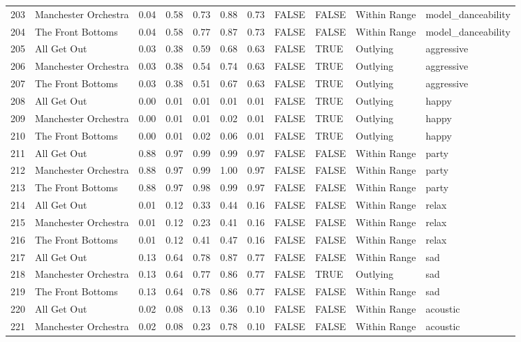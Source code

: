 \begin{table}[ht]
\begin{tabular}{rlrrrrrllll}
  203 & Manchester Orchestra & 0.04 & 0.58 & 0.73 & 0.88 & 0.73 & FALSE & FALSE & Within Range & model\_danceability \\ 
  204 & The Front Bottoms & 0.04 & 0.58 & 0.77 & 0.87 & 0.73 & FALSE & FALSE & Within Range & model\_danceability \\ 
  205 & All Get Out & 0.03 & 0.38 & 0.59 & 0.68 & 0.63 & FALSE & TRUE & Outlying & aggressive \\ 
  206 & Manchester Orchestra & 0.03 & 0.38 & 0.54 & 0.74 & 0.63 & FALSE & TRUE & Outlying & aggressive \\ 
  207 & The Front Bottoms & 0.03 & 0.38 & 0.51 & 0.67 & 0.63 & FALSE & TRUE & Outlying & aggressive \\ 
  208 & All Get Out & 0.00 & 0.01 & 0.01 & 0.01 & 0.01 & FALSE & TRUE & Outlying & happy \\ 
  209 & Manchester Orchestra & 0.00 & 0.01 & 0.01 & 0.02 & 0.01 & FALSE & TRUE & Outlying & happy \\ 
  210 & The Front Bottoms & 0.00 & 0.01 & 0.02 & 0.06 & 0.01 & FALSE & TRUE & Outlying & happy \\ 
  211 & All Get Out & 0.88 & 0.97 & 0.99 & 0.99 & 0.97 & FALSE & FALSE & Within Range & party \\ 
  212 & Manchester Orchestra & 0.88 & 0.97 & 0.99 & 1.00 & 0.97 & FALSE & FALSE & Within Range & party \\ 
  213 & The Front Bottoms & 0.88 & 0.97 & 0.98 & 0.99 & 0.97 & FALSE & FALSE & Within Range & party \\ 
  214 & All Get Out & 0.01 & 0.12 & 0.33 & 0.44 & 0.16 & FALSE & FALSE & Within Range & relax \\ 
  215 & Manchester Orchestra & 0.01 & 0.12 & 0.23 & 0.41 & 0.16 & FALSE & FALSE & Within Range & relax \\ 
  216 & The Front Bottoms & 0.01 & 0.12 & 0.41 & 0.47 & 0.16 & FALSE & FALSE & Within Range & relax \\ 
  217 & All Get Out & 0.13 & 0.64 & 0.78 & 0.87 & 0.77 & FALSE & FALSE & Within Range & sad \\ 
  218 & Manchester Orchestra & 0.13 & 0.64 & 0.77 & 0.86 & 0.77 & FALSE & TRUE & Outlying & sad \\ 
  219 & The Front Bottoms & 0.13 & 0.64 & 0.78 & 0.86 & 0.77 & FALSE & FALSE & Within Range & sad \\ 
  220 & All Get Out & 0.02 & 0.08 & 0.13 & 0.36 & 0.10 & FALSE & FALSE & Within Range & acoustic \\ 
  221 & Manchester Orchestra & 0.02 & 0.08 & 0.23 & 0.78 & 0.10 & FALSE & FALSE & Within Range & acoustic \\ 

\end{tabular}
\end{table}
